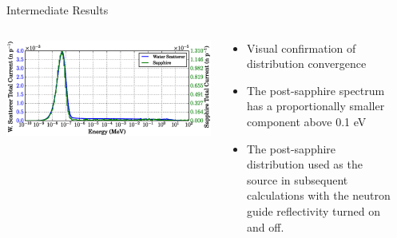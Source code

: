 \documentclass[final,t]{beamer}
\begin{document}
\begin{frame}{}
\begin{columns}[t]
\begin{column}{.3\linewidth}
\begin{block}{Intermediate Results}
      \begin{columns}

      \begin{column}{0.5\linewidth}
      \vspace{-2ex}
        \includegraphics*[width=\linewidth]{specs_narrow.eps}
      \end{column}
      \begin{column}{0.5\linewidth}
      \vspace{-2ex}
      \begin{itemize}
        \item Visual confirmation of distribution convergence
        \item The post-sapphire spectrum has a proportionally smaller component above 0.1 eV
        \item The post-sapphire distribution used as the source in subsequent calculations with the neutron guide reflectivity turned on and off. 
        \end{itemize}
      \end{column}

      \end{columns}

      \end{block}



    \end{column}

    
    \begin{column}{.3\linewidth}


\end{column}
\end{columns}
\end{frame}
\end{document}
